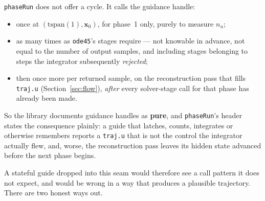 \documentclass[11pt]{article}
\newcommand{\code}[1]{\texttt{#1}}
\begin{document}
\code{phaseRun} does not offer a cycle. It calls the guidance handle:

\begin{itemize}
\item once at $(\text{tspan}(1),\mathbf{x}_0)$, for phase~1 only, purely to
measure $n_u$;
\item as many times as \code{ode45}'s stages require --- not knowable in
advance, not equal to the number of output samples, and including stages
belonging to steps the integrator subsequently \emph{rejected};
\item then once more per returned sample, on the reconstruction pass that
fills \code{traj.u} (Section~\ref{sec:flow}), \emph{after} every solver-stage
call for that phase has already been made.
\end{itemize}

So the library documents guidance handles as \textbf{pure}, and
\code{phaseRun}'s header states the consequence plainly: a guide that latches,
counts, integrates or otherwise remembers reports a \code{traj.u} that is not
the control the integrator actually flew, and, worse, the reconstruction pass
leaves its hidden state advanced before the next phase begins.

A stateful guide dropped into this seam would therefore see a call pattern it
does not expect, and would be wrong in a way that produces a plausible
trajectory. There are two honest ways out.
\end{document}
